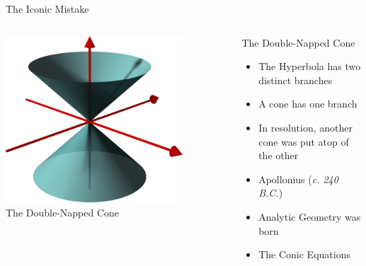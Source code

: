 \documentclass[14pt,aspectratio=169]{beamer}
\begin{document}
\begin{frame}{The Iconic Mistake}
    \begin{columns}
        \centering
        \includegraphics[width=0.8\textwidth]{image05.png}\\
        The Double-Napped Cone
        \begin{block}{The Double-Napped Cone}
        \vspace{1mm}
         \begin{itemize}

          \item The Hyperbola has two distinct branches
          \item A cone has one branch
          \item In resolution, another cone was put atop of the other
          \item Apollonius (\textit{c. 240 B.C.})
          \item Analytic Geometry was born
          \item The Conic Equations
         \end{itemize}
         \vspace{1mm}

        \end{block}

    \end{columns}


\end{frame}
\end{document}
